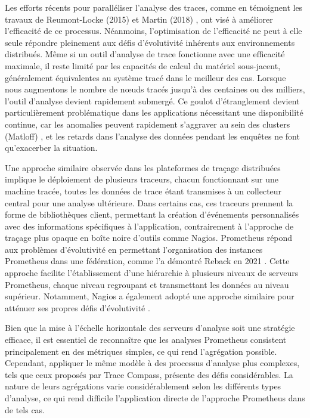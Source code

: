Les efforts récents pour paralléliser l'analyse des traces, comme en témoignent les travaux de Reumont-Locke (2015) \cite{reumont2015methodes} et Martin (2018) \cite{Martin2018}, ont visé à améliorer l'efficacité de ce processus. Néanmoins, l'optimisation de l'efficacité ne peut à elle seule répondre pleinement aux défis d'évolutivité inhérents aux environnements distribués. Même si un outil d'analyse de trace fonctionne avec une efficacité maximale, il reste limité par les capacités de calcul du matériel sous-jacent, généralement équivalentes au système tracé dans le meilleur des cas. Lorsque nous augmentons le nombre de nœuds tracés jusqu'à des centaines ou des milliers, l'outil d'analyse devient rapidement submergé. Ce goulot d'étranglement devient particulièrement problématique dans les applications nécessitant une disponibilité continue, car les anomalies peuvent rapidement s'aggraver au sein des clusters (Matloff) \cite{matloff2011programming}, et les retards dans l'analyse des données pendant les enquêtes ne font qu'exacerber la situation.

Une approche similaire observée dans les plateformes de traçage distribuées implique le déploiement de plusieurs traceurs, chacun fonctionnant sur une machine tracée, toutes les données de trace étant transmises à un collecteur central pour une analyse ultérieure. Dans certains cas, ces traceurs prennent la forme de bibliothèques client, permettant la création d'événements personnalisés avec des informations spécifiques à l'application, contrairement à l'approche de traçage plus opaque en boîte noire d'outils comme Nagios. Prometheus répond aux problèmes d'évolutivité en permettant l'organisation des instances Prometheus dans une fédération, comme l'a démontré Reback en 2021 \cite{Logz.io_prometheus_2023}. Cette approche facilite l'établissement d'une hiérarchie à plusieurs niveaux de serveurs Prometheus, chaque niveau regroupant et transmettant les données au niveau supérieur. Notamment, Nagios a également adopté une approche similaire pour atténuer ses propres défis d'évolutivité \cite{Nagios2019}.

Bien que la mise à l'échelle horizontale des serveurs d'analyse soit une stratégie efficace, il est essentiel de reconnaître que les analyses Prometheus consistent principalement en des métriques simples, ce qui rend l'agrégation possible. Cependant, appliquer le même modèle à des processus d'analyse plus complexes, tels que ceux proposés par Trace Compass, présente des défis considérables. La nature de leurs agrégations varie considérablement selon les différents types d'analyse, ce qui rend difficile l'application directe de l’approche Prometheus dans de tels cas.

